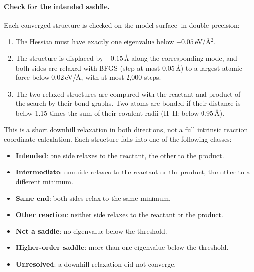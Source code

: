 \paragraph{Check for the intended saddle.} Each converged structure is checked on the model surface, in double precision:
\begin{enumerate}
  \item The Hessian must have exactly one eigenvalue below $-0.05$\,eV/\AA$^2$.
  \item The structure is displaced by $\pm 0.15$\,\AA{} along the corresponding mode, and both sides are relaxed with BFGS (step at most 0.05\,\AA) to a largest atomic force below 0.02\,eV/\AA{}, with at most 2,000 steps.
  \item The two relaxed structures are compared with the reactant and product of the search by their bond graphs. Two atoms are bonded if their distance is below 1.15 times the sum of their covalent radii (H--H: below 0.95\,\AA).
\end{enumerate}
This is a short downhill relaxation in both directions, not a full intrinsic reaction coordinate calculation. Each structure falls into one of the following classes:
\begin{itemize}
  \item \textbf{Intended}: one side relaxes to the reactant, the other to the product.
  \item \textbf{Intermediate}: one side relaxes to the reactant or the product, the other to a different minimum.
  \item \textbf{Same end}: both sides relax to the same minimum.
  \item \textbf{Other reaction}: neither side relaxes to the reactant or the product.
  \item \textbf{Not a saddle}: no eigenvalue below the threshold.
  \item \textbf{Higher-order saddle}: more than one eigenvalue below the threshold.
  \item \textbf{Unresolved}: a downhill relaxation did not converge.
\end{itemize}

